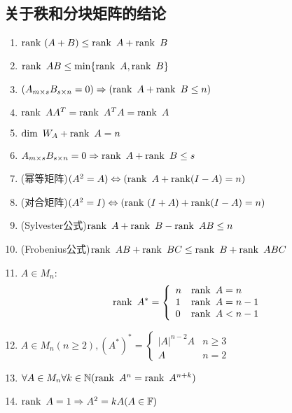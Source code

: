\documentclass[UTF8,a4paper,notitlepage]{book}
\begin{document}
        \subsection{关于秩和分块矩阵的结论}%
        \begin{corollary}\mbox{}\begin{enumerate}
            \item $\operatorname{rank}~(A+B)\leq \operatorname{rank}~A+\operatorname{rank}~B$
            \item $\operatorname{rank}~AB\leq\min\{\operatorname{rank}~A,\operatorname{rank}~B\}$
            \item $(A_{m\times s}B_{s\times n}=0)\Rightarrow (\operatorname{rank}~A+\operatorname{rank}~B\leq n)$
            \item $\operatorname{rank}~AA^T=\operatorname{rank}~A^TA=\operatorname{rank}~A$
            \item $\dim~W_A+\operatorname{rank}~A=n$
            \item $A_{m\times s}B_{s\times n}=0\Rightarrow \operatorname{rank}~A+\operatorname{rank}~B\leq s$
            \item (幂等矩阵)$(A^2=A)\Leftrightarrow(\operatorname{rank}~A+\operatorname{rank}(I-A)=n)$
            \item (对合矩阵)$(A^2=I)\Leftrightarrow(\operatorname{rank}~(I+A)+\operatorname{rank}(I-A)=n)$
            \item (Sylvester公式)$\operatorname{rank}~A+\operatorname{rank}~B-\operatorname{rank}~AB\leq n$
            \item (Frobenius公式)$\operatorname{rank}~AB+\operatorname{rank}~BC\leq \operatorname{rank}~B+\operatorname{rank}~ABC$
            \item $A\in M_n$:$$\operatorname{rank}~A^*=\left\{\begin{array}{ll} n&\operatorname{rank}~A=n\\ 1&\operatorname{rank}~A=n-1\\ 0&\operatorname{rank}~A<n-1\\ \end{array}\right.$$
            \item $A\in M_n(n\geq 2), (A^*)^*=\left\{\begin{array}{ll}|A|^{n-2}A&n\geq 3\\ A&n=2\end{array}\right.$
            \item $\forall A\in M_n \forall k\in \mathbb{N}(\operatorname{rank}~A^n=\operatorname{rank}~A^{n+k})$
            \item $\operatorname{rank}~A=1\Rightarrow A^2=kA(A\in \mathbb{F})$
        \end{enumerate}\end{corollary}
\end{document}
